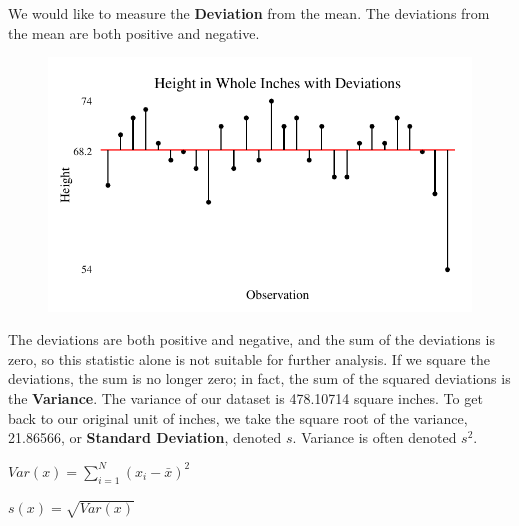 \documentclass[nohyper,justified]{tufte-handout}\usepackage[]{graphicx}\usepackage[]{color}
\makeatletter
\def\maxwidth{ %
  \ifdim\Gin@nat@width>\linewidth
    \linewidth
  \else
    \Gin@nat@width
  \fi
}
\newenvironment{knitrout}{}{} %
\makeatother
\begin{document}
We would like to measure the \textbf{Deviation} from the mean. The deviations from the mean are both positive and negative.


\begin{figure}
\begin{knitrout}
\color{fgcolor}

{\centering \includegraphics[width=\maxwidth]{figure/graphics-mean-center-chart-1} 

}



\end{knitrout}
\end{figure}

The deviations are both positive and negative, and the sum of the deviations is zero, so this statistic alone is not suitable for further analysis. If we square the deviations, the sum is no longer zero; in fact, the sum of the squared deviations is the \textbf{Variance}. The variance of our dataset is 478.10714 square inches. To get back to our original unit of inches, we take the square root of the variance, 21.86566, or \textbf{Standard Deviation}, denoted $s$. Variance is often denoted $s^2$.

$Var(x)=\sum_{i=1}^{N} (x_i-\bar{x})^2$

$s(x)=\sqrt{Var(x)}$
\end{document}
